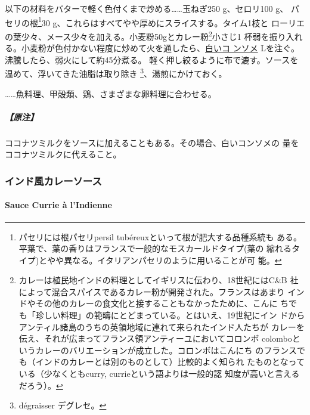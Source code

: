 \begin{recette}

以下の材料をバターで軽く色付くまで炒める\ldots{}\ldots{}玉ねぎ250
g、セロリ100 g、 パセリの根\footnote{パセリには根パセリpersil
  tubéreuxといって根が肥大する品種系統も
  ある。平葉で、葉の香りはフランスで一般的なモスカールドタイプ(葉の
  縮れるタイプ)とやや異なる。イタリアンパセリのように用いることが可 能。}30
g、これらはすべてやや厚めにスライスする。タイム1枝と
ローリエの葉少々、メース少々を加える。小麦粉50gとカレー粉\footnote{カレーは植民地インドの料理としてイギリスに伝わり、18世紀にはC\&B
  社によって混合スパイスであるカレー粉が開発された。フランスはあまり
  インドやその他のカレーの食文化と接することもなかったために、こんに
  ちでも「珍しい料理」の範疇にとどまっている。とはいえ、19世紀にイン
  ドからアンティル諸島のうちの英領地域に連れて来られたインド人たちが
  カレーを伝え、それが広まってフランス領アンティーユにおいてコロンボ
  colomboというカレーのバリエーションが成立した。コロンボはこんにち
  のフランスでも（インドのカレーとは別のものとして）比較的よく知られ
  たものとなっている（少なくともcurry, currieという語よりは一般的認
  知度が高いと言えるだろう）。}小さじ1
杯弱を振り入れる。小麦粉が色付かない程度に炒めて火を通したら、\protect\hyperlink{}{白いコ
ンソメ} \troisquarts{} Lを注ぐ。沸騰したら、弱火にして約45分煮る。
軽く押し絞るように布で漉す。ソースを温めて、浮いてきた油脂は取り除き
\footnote{dégraisser デグレセ。}、湯煎にかけておく。

\ldots{}\ldots{}魚料理、甲殻類、鶏、さまざまな卵料理に合わせる。

\hypertarget{ux539fux6ce8-6}{%
\subparagraph{【原注】}\label{ux539fux6ce8-6}}

ココナツミルクをソースに加えることもある。その場合、白いコンソメの
\unquart{}量をココナツミルクに代えること。

\maeaki

\hypertarget{ux30a4ux30f3ux30c9ux98a8ux30abux30ecux30fcux30bdux30fcux30b9}{%
\subsubsection{インド風カレーソース}\label{ux30a4ux30f3ux30c9ux98a8ux30abux30ecux30fcux30bdux30fcux30b9}}

\hypertarget{sauce-currie-indienne}{%
\paragraph{Sauce Currie à l'Indienne}\label{sauce-currie-indienne}}


\end{recette}

